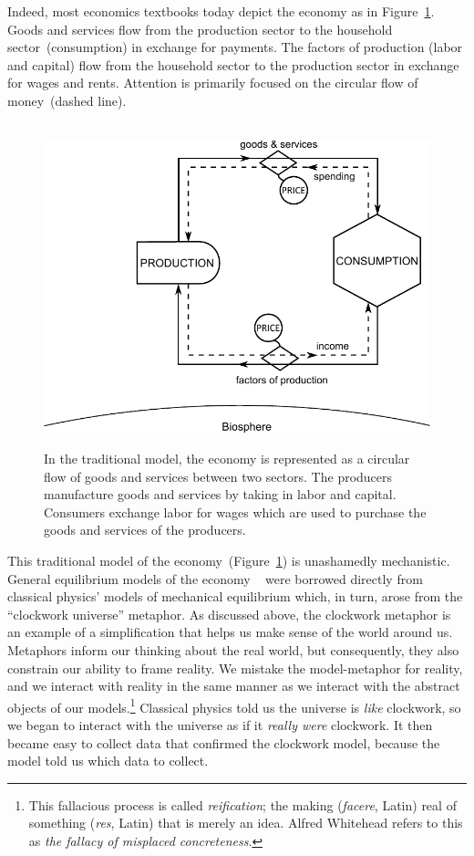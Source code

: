 Indeed, most economics textbooks today depict the economy 
as in Figure~\ref{fig:perp_motion_1}.
Goods and services flow from the production sector
to the household sector~(consumption)
in exchange for payments.
The factors of production (labor and capital)
flow from the household sector to the
production sector in exchange for wages and rents.
Attention is primarily focused on the circular flow
of money~(dashed line).


\begin{figure}[!ht]
\centering\
\includegraphics[width=\linewidth]{Part_0/Chapter_Introduction/images/Perpetual_motion_1.pdf}
\caption[The traditional model]{In the traditional model, the economy 
is represented as a circular flow of goods and services between two sectors. 
The producers manufacture goods and services 
by taking in labor and capital. 
Consumers exchange labor for wages 
which are used to purchase 
the goods and services of the producers.}
\label{fig:perp_motion_1}
\end{figure}

This traditional model of the economy~(Figure~\ref{fig:perp_motion_1}) 
is unashamedly mechanistic.
General equilibrium models of the economy
~\cite{Walras1892, Walras1993}
were borrowed directly from classical physics' models of 
mechanical equilibrium which, in turn, arose from the 
``clockwork universe'' metaphor.\cite{Ingrao1990}
As discussed above, 
the clockwork metaphor is an example  
of a simplification that helps us make sense of the world around us.
Metaphors inform our thinking about the real world,
but consequently,
they also constrain our ability to frame reality.
We mistake the model-metaphor for reality, and
we interact with reality in the same manner 
as we interact with the abstract objects of our
models.\footnote{This fallacious process is called
	\emph{reification}; the making (\emph{facere}, Latin) real of
	something (\emph{res}, Latin) that is merely an idea.
	Alfred Whitehead refers to this as
	\emph{the fallacy of misplaced concreteness}.\cite{Whitehead2011}
	}
Classical physics told us the universe is
\emph{like} clockwork, 
so we began to interact with the universe
as if it \emph{really were} clockwork.
It then became easy to collect data that confirmed the clockwork model,
because the model told us which data to collect.

